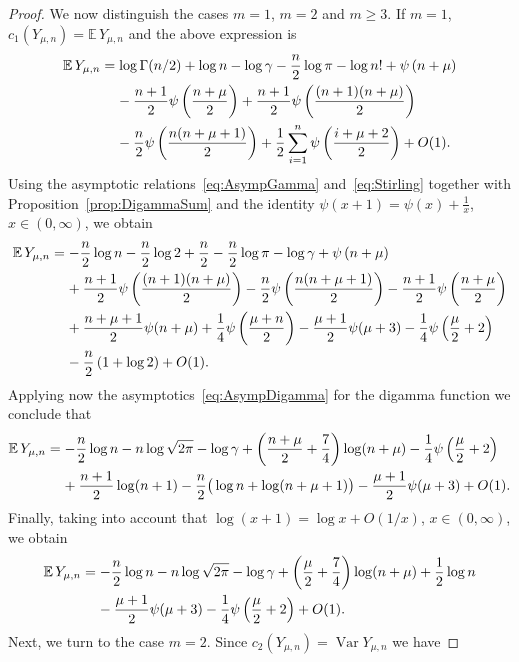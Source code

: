 \documentclass[10pt]{amsart}
\theoremstyle{definition}\newtheorem{defi}[theo]{Definition}\newtheorem{rema}[theo]{Remark}\newtheorem{exam}[theo]{Example}\newtheorem{exem}[theo]{Example}\newtheorem{nota}[theo]{Notation}
\newcommand{\EE}{\mathbb{E}\,}
\newcommand{\Var}{\mathop{\mathrm{Var}}\nolimits}
\begin{document}
\begin{proof}
We now distinguish the cases $m=1$, $m=2$ and $m\geq 3$. If $m=1$, $c_1(Y_{\mu,n})=\EE Y_{\mu,n}$ and the above expression is
\begin{align*}
\EE Y_{\mu,n}&=\log \Gamma(n/2)+\log n-\log\gamma-\frac{n}{2}\log\pi-\log n!+\psi\left(n+\mu\right)\\
&\mkern20mu -\frac{n+1}{2}\psi\left(\frac{n+\mu}{2}\right)+\frac{n+1}{2}\psi\left(\frac{(n+1)(n+\mu)}{2}\right)\\
&\mkern20mu -\frac{n}{2}\psi\left(\frac{n(n+\mu+1)}{2}\right)+\frac12\sum\limits_{i=1}^{n}\psi\left(\frac{i+\mu+2}{2}\right)+O(1).
\end{align*}
Using the asymptotic relations~\eqref{eq:AsympGamma} and~\eqref{eq:Stirling} together with Proposition~\ref{prop:DigammaSum} and the identity $\psi(x+1)=\psi(x)+\frac{1}{x}$, $x\in(0,\infty)$, we obtain
\begin{align*}
\EE Y_{\mu,n}&=-\frac{n}{2}\log n-\frac{n}{2}\log 2+\frac{n}{2}-\frac{n}{2}\log\pi-\log\gamma+\psi\left(n+\mu\right)\\
&\mkern20mu +\frac{n+1}{2}\psi\left(\frac{(n+1)(n+\mu)}{2}\right)-\frac{n}{2}\psi\left(\frac{n(n+\mu+1)}{2}\right)-\frac{n+1}{2}\psi\left(\frac{n+\mu}{2}\right)\\
&\mkern20mu + \frac{n+\mu+1}{2}\psi (n+\mu)+\frac{1}{4}\psi\left(\frac{\mu+n}{2}\right)-\frac{\mu+1}{2}\psi(\mu+3)-\frac{1}{4}\psi\left(\frac{\mu}{2}+2\right)\\
&\mkern20mu -\frac{n}{2}\left(1+\log 2\right) +O(1).
\end{align*}
Applying now the asymptotics~\eqref{eq:AsympDigamma} for the digamma function we conclude that
\begin{align*}
\EE Y_{\mu,n}&=-\frac{n}{2}\log n-n\log\sqrt{2\pi}-\log\gamma +\left(\frac{n+\mu}{2}+\frac{7}{4}\right)\log(n+\mu)-\frac{1}{4}\psi\left(\frac{\mu}{2}+2\right)\\
&\mkern20mu+\frac{n+1}{2}\log(n+1)-\frac{n}{2}\big(\log n+\log(n+\mu+1)\big)-\frac{\mu+1}{2}\psi(\mu+3)+O(1).
\end{align*}
Finally, taking into account that $\log (x+1)=\log x+O(1/x)$, $x\in(0,\infty)$, we obtain
\begin{align*}
\EE Y_{\mu,n}&=-\frac{n}{2}\log n-n\log\sqrt{2\pi}-\log\gamma +\left(\frac{\mu}{2}+\frac{7}{4}\right)\log(n+\mu)+\frac{1}{2}\log n\\
&\mkern20mu-\frac{\mu+1}{2}\psi(\mu+3)-\frac{1}{4}\psi\left(\frac{\mu}{2}+2\right)+O(1).
\end{align*}
Next, we turn to the case $m=2$. Since $c_2(Y_{\mu, n})=\Var Y_{\mu,n}$ we have

\end{proof}
\end{document}
